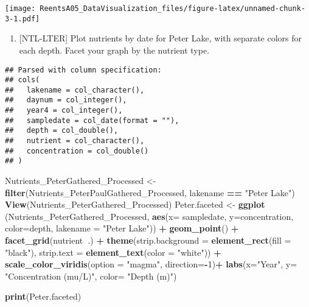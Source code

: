 \documentclass[]{article}
\newenvironment{Shaded}{\begin{snugshade}}{\end{snugshade}}
\newcommand{\KeywordTok}[1]{\textcolor[rgb]{0.13,0.29,0.53}{\textbf{#1}}}
\newcommand{\DataTypeTok}[1]{\textcolor[rgb]{0.13,0.29,0.53}{#1}}
\newcommand{\DecValTok}[1]{\textcolor[rgb]{0.00,0.00,0.81}{#1}}
\newcommand{\StringTok}[1]{\textcolor[rgb]{0.31,0.60,0.02}{#1}}
\newcommand{\CommentTok}[1]{\textcolor[rgb]{0.56,0.35,0.01}{\textit{#1}}}
\newcommand{\OperatorTok}[1]{\textcolor[rgb]{0.81,0.36,0.00}{\textbf{#1}}}
\newcommand{\NormalTok}[1]{#1}
\providecommand{\tightlist}{%
  \setlength{\itemsep}{0pt}\setlength{\parskip}{0pt}}
\begin{document}
\texttt{[image: ReentsA05\_DataVisualization\_files/figure-latex/unnamed-chunk-3-1.pdf]}

\begin{enumerate}
\def\labelenumi{\arabic{enumi}.}
\setcounter{enumi}{4}
\tightlist
\item
  {[}NTL-LTER{]} Plot nutrients by date for Peter Lake, with separate
  colors for each depth. Facet your graph by the nutrient type.
\end{enumerate}

\begin{Shaded}
\end{Shaded}

\begin{verbatim}
## Parsed with column specification:
## cols(
##   lakename = col_character(),
##   daynum = col_integer(),
##   year4 = col_integer(),
##   sampledate = col_date(format = ""),
##   depth = col_double(),
##   nutrient = col_character(),
##   concentration = col_double()
## )
\end{verbatim}

\begin{Shaded}
\begin{Highlighting}[]
\NormalTok{Nutrients_PeterGathered_Processed <-}\StringTok{ }\KeywordTok{filter}\NormalTok{(Nutrients_PeterPaulGathered_Processed, lakename }\OperatorTok{==}\StringTok{ "Peter Lake"}\NormalTok{)}
\KeywordTok{View}\NormalTok{(Nutrients_PeterGathered_Processed)}
\NormalTok{Peter.faceted <-}\StringTok{ }\KeywordTok{ggplot}\NormalTok{ (Nutrients_PeterGathered_Processed, }\KeywordTok{aes}\NormalTok{(}\DataTypeTok{x=}\NormalTok{ sampledate, }\DataTypeTok{y=}\NormalTok{concentration, }\DataTypeTok{color=}\NormalTok{depth, }\DataTypeTok{lakename =} \StringTok{"Peter Lake"}\NormalTok{)) }\OperatorTok{+}
\StringTok{  }\KeywordTok{geom_point}\NormalTok{() }\OperatorTok{+}
\StringTok{  }\KeywordTok{facet_grid}\NormalTok{(nutrient}\OperatorTok{~}\NormalTok{.) }\OperatorTok{+}
\StringTok{  }\KeywordTok{theme}\NormalTok{(}\DataTypeTok{strip.background =} \KeywordTok{element_rect}\NormalTok{(}\DataTypeTok{fill =} \StringTok{"black"}\NormalTok{), }\DataTypeTok{strip.text =} \KeywordTok{element_text}\NormalTok{(}\DataTypeTok{color =} \StringTok{"white"}\NormalTok{)) }\OperatorTok{+}
\StringTok{  }\KeywordTok{scale_color_viridis}\NormalTok{(}\DataTypeTok{option =} \StringTok{"magma"}\NormalTok{, }\DataTypeTok{direction=}\OperatorTok{-}\DecValTok{1}\NormalTok{)}\OperatorTok{+}
\StringTok{  }\KeywordTok{labs}\NormalTok{(}\DataTypeTok{x=}\StringTok{"Year"}\NormalTok{, }\DataTypeTok{y=} \StringTok{"Concentration (mu/L)"}\NormalTok{, }\DataTypeTok{color=} \StringTok{"Depth (m)"}\NormalTok{)}
  


\KeywordTok{print}\NormalTok{(Peter.faceted)}
\end{Highlighting}
\end{Shaded}
\end{document}

